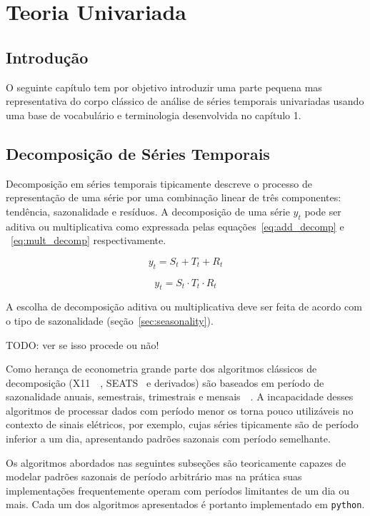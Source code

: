 \chapter{Teoria Univariada}
\label{chap:univariate_theory}

\section*{Introdução}

O seguinte capítulo tem por objetivo introduzir uma parte pequena mas
representativa do corpo clássico de análise de séries temporais univariadas
usando uma base de vocabulário e terminologia desenvolvida no capítulo 1.

\section{Decomposição de Séries Temporais}
\label{sec:decomposition}

Decomposição em séries temporais tipicamente descreve o processo de
representação de uma série por uma combinação linear de três componentes:
tendência, sazonalidade e resíduos. A decomposição de uma série $y_t$ pode ser
aditiva ou multiplicativa como expressada pelas equações~\ref{eq:add_decomp} e
~\ref{eq:mult_decomp} respectivamente.

\begin{equation}\label{eq:add_decomp}
    y_t = S_t + T_t + R_t
\end{equation}

\begin{equation}\label{eq:mult_decomp}
    y_t = S_t \cdot T_t \cdot R_t
\end{equation}

A escolha de decomposição aditiva ou multiplicativa deve ser feita de acordo
com o tipo de sazonalidade (seção~\ref{sec:seasonality}).

TODO: ver se isso procede ou não!

Como herança de econometria grande parte dos algoritmos clássicos de
decomposição (X11~~\cite{x11}, SEATS~\cite[capítulo~5.2]{SEATS} e derivados) são
baseados em período de sazonalidade anuais, semestrais, trimestrais e
mensais~~\cite{athana}. A incapacidade desses algoritmos de processar dados com
período menor os torna pouco utilizáveis no contexto de sinais elétricos, por
exemplo, cujas séries tipicamente são de período inferior a um dia,
apresentando padrões sazonais com período semelhante.

Os algoritmos abordados nas seguintes subseções são teoricamente capazes de
modelar padrões sazonais de período arbitrário mas na prática suas
implementações frequentemente operam com períodos limitantes de um dia ou
mais. Cada um dos algoritmos apresentados é portanto implementado em
\verb+python+.

